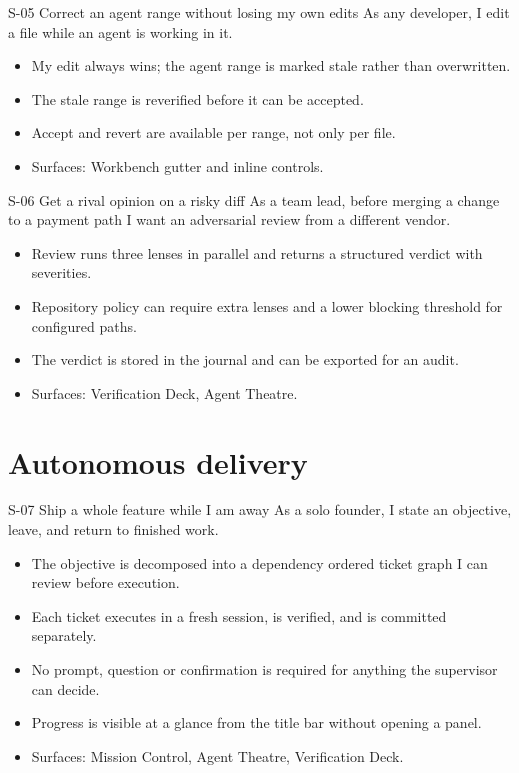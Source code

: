 \begin{story}{S-05 \quad Correct an agent range without losing my own edits}
As any developer, I edit a file while an agent is working in it.
\end{story}
\begin{itemize}
  \item My edit always wins; the agent range is marked stale rather than overwritten.
  \item The stale range is reverified before it can be accepted.
  \item Accept and revert are available per range, not only per file.
  \item Surfaces: Workbench gutter and inline controls.
\end{itemize}

\begin{story}{S-06 \quad Get a rival opinion on a risky diff}
As a team lead, before merging a change to a payment path I want an adversarial review from a
different vendor.
\end{story}
\begin{itemize}
  \item Review runs three lenses in parallel and returns a structured verdict with severities.
  \item Repository policy can require extra lenses and a lower blocking threshold for
  configured paths.
  \item The verdict is stored in the journal and can be exported for an audit.
  \item Surfaces: Verification Deck, Agent Theatre.
\end{itemize}

\section{Autonomous delivery}

\begin{story}{S-07 \quad Ship a whole feature while I am away}
As a solo founder, I state an objective, leave, and return to finished work.
\end{story}
\begin{itemize}
  \item The objective is decomposed into a dependency ordered ticket graph I can review before
  execution.
  \item Each ticket executes in a fresh session, is verified, and is committed separately.
  \item No prompt, question or confirmation is required for anything the supervisor can decide.
  \item Progress is visible at a glance from the title bar without opening a panel.
  \item Surfaces: Mission Control, Agent Theatre, Verification Deck.
\end{itemize}

